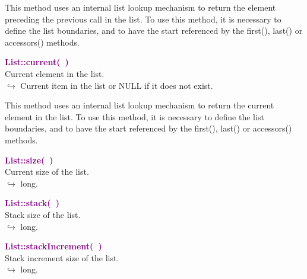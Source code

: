 This method uses an internal list lookup mechanism to return the element preceding the previous call in the list.
To use this method, it is necessary to define the list boundaries, and to have the start referenced by the first(), last() or accessors() methods.

\textcolor{purple}{\textbf{List::current(~)}}\label{List::current()}\\
Current element in the list.\\ \hspace*{10mm}$\hookrightarrow$ Current item in the list or NULL if it does not exist.

This method uses an internal list lookup mechanism to return the current element in the list.
To use this method, it is necessary to define the list boundaries, and to have the start referenced by the first(), last() or accessors() methods.

\textcolor{purple}{\textbf{List::size(~)}}\label{List::size()}\\
Current size of the list.\\ \hspace*{10mm}$\hookrightarrow$ long.


\textcolor{purple}{\textbf{List::stack(~)}}\label{List::stack()}\\
Stack size of the list.\\ \hspace*{10mm}$\hookrightarrow$ long.


\textcolor{purple}{\textbf{List::stackIncrement(~)}}\label{List::stackIncrement()}\\
Stack increment size of the list.\\ \hspace*{10mm}$\hookrightarrow$ long.

